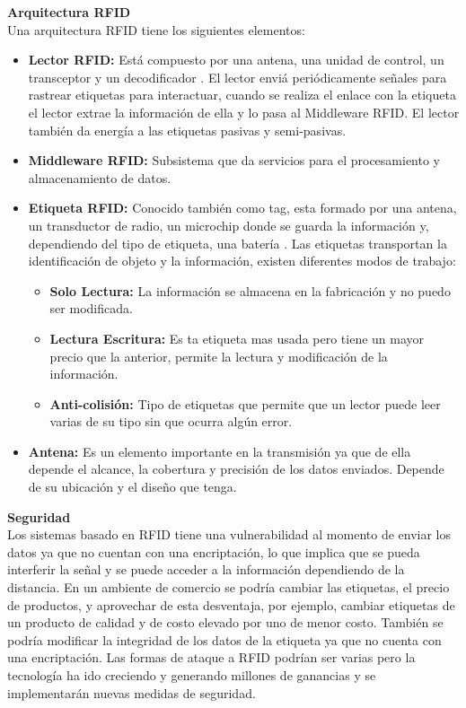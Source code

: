 \documentclass[11pt,openany]{book}
\newcounter{ns}
\begin{document}
	\textbf{Arquitectura RFID}\\[0.25cm]
	Una arquitectura RFID tiene los siguientes elementos:
	\begin{itemize}
		\item \textbf{Lector RFID: }Está compuesto por una antena, una unidad de control, un transceptor y un decodificador \cite{Cherrez2010}. El lector enviá periódicamente señales para rastrear etiquetas para interactuar, cuando se realiza el enlace con la etiqueta el lector extrae la información de ella y lo pasa al Middleware RFID. El lector también da energía a las etiquetas pasivas y semi-pasivas.
		\item \textbf{Middleware RFID: } Subsistema que da servicios para el procesamiento y almacenamiento de datos.
		\item \textbf{Etiqueta RFID: }Conocido también como tag, esta formado por una antena, un transductor de radio, un microchip donde se guarda la información y, dependiendo del tipo de etiqueta, una batería \cite{Cherrez2010}. Las etiquetas transportan la identificación de objeto y la información, existen diferentes modos de trabajo:
		\begin{itemize}
			\item \textbf{Solo Lectura: }La información se almacena en la fabricación y no puedo ser modificada.
			\item \textbf{Lectura Escritura: }Es ta etiqueta mas usada pero tiene un mayor precio que la anterior, permite la lectura y modificación de la información.
			\item \textbf{Anti-colisión: }Tipo de etiquetas que permite que un lector puede leer varias de su tipo sin que ocurra algún error.
		\end{itemize}
		\item \textbf{Antena: }Es un elemento importante en la transmisión ya que de ella depende el alcance, la cobertura y precisión de los datos enviados. Depende de su ubicación y el diseño que tenga.
	\end{itemize}

	\textbf{Seguridad}\\[0.25cm]
	Los sistemas basado en RFID tiene una vulnerabilidad al momento de enviar los datos ya que no cuentan con una encriptación, lo que implica que se pueda interferir la señal y se puede acceder a la información dependiendo de la distancia. En un ambiente de comercio se podría cambiar las etiquetas, el precio de productos, y aprovechar de esta desventaja, por ejemplo, cambiar etiquetas de un producto de calidad y de costo elevado por uno de menor costo. También se podría modificar la integridad de los datos de la etiqueta ya que no cuenta con una encriptación. Las formas de ataque a RFID podrían ser varias pero la tecnología ha ido creciendo y generando millones de ganancias y se implementarán nuevas medidas de seguridad.
\end{document}
